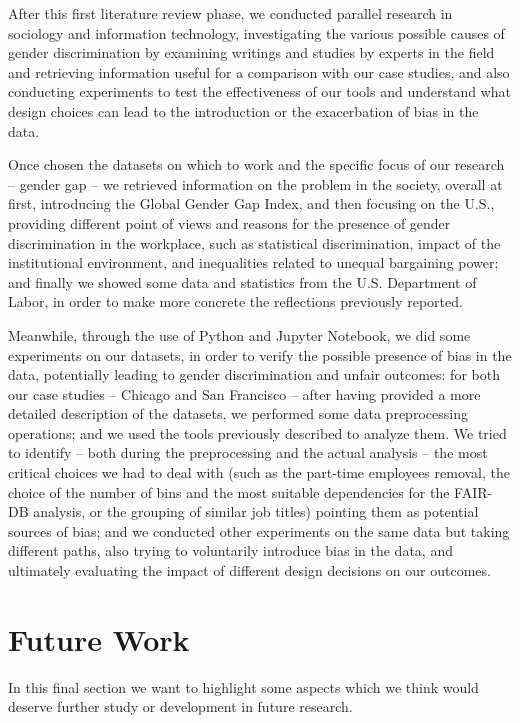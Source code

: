 After this first literature review phase, we conducted parallel research in sociology and information technology, investigating the various possible causes of gender discrimination by examining writings and studies by experts in the field and retrieving information useful for a comparison with our case studies, and also conducting experiments to test the effectiveness of our tools and understand what design choices can lead to the introduction or the exacerbation of bias in the data.

Once chosen the datasets on which to work and the specific focus of our research -- gender gap -- we retrieved information on the problem in the society, overall at first, introducing the Global Gender Gap Index, and then focusing on the U.S., providing different point of views and reasons for the presence of gender discrimination in the workplace, such as statistical discrimination, impact of the institutional environment, and inequalities related to unequal bargaining power; and finally we showed some data and statistics from the U.S. Department of Labor, in order to make more concrete the reflections previously reported.

Meanwhile, through the use of Python and Jupyter Notebook, we did some experiments on our datasets, in order to verify the possible presence of bias in the data, potentially leading to gender discrimination and unfair outcomes: for both our case studies -- Chicago and San Francisco -- after having provided a more detailed description of the datasets, we performed some data preprocessing operations; and we used the tools previously described to analyze them. We tried to identify -- both during the preprocessing and the actual analysis -- the most critical choices we had to deal with (such as the part-time employees removal, the choice of the number of bins and the most suitable dependencies for the FAIR-DB analysis, or the grouping of similar job titles) pointing them as potential sources of bias; and we conducted other experiments on the same data but taking different paths, also trying to voluntarily introduce bias in the data, and ultimately evaluating the impact of different design decisions on our outcomes.


\section{Future Work}
In this final section we want to highlight some aspects which we think would deserve further study or development in future research.


